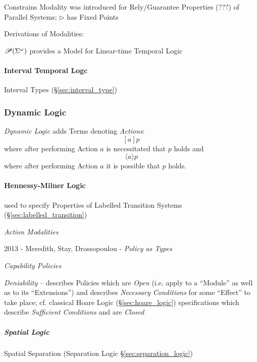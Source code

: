 Constrains Modality was introduced for Rely/Guarantee Properties (???)
of Parallel Systems; $\rhd$ has Fixed Points

Derivations of Modalities: %

$\mathscr{P}(\Sigma^\omega)$ provides a Model for Linear-time Temporal Logic
\cite{abramsky-gay-nagarajan96}



\paragraph{Interval Temporal Logc}\label{sec:interval_temporal}\hfill

Interval Types (\S\ref{sec:interval_type})



\subsubsection{Dynamic Logic}\label{sec:dynamic_logic}

\emph{Dynamic Logic} adds Terms denoting \emph{Actions}:
\[
  [a]p
\]
where after performing Action $a$ is necessitated that $p$ holds and
\[
  \langle a \rangle p
\]
where after performing Action $a$ it is possible that $p$ holds.



\paragraph{Hennessy-Milner Logic}\label{sec:hennessy_milner}
\hfill

used to specify Properties of Labelled Transition Systems
(\S\ref{sec:labelled_transition})

\emph{Action Modalities}

2013 - Meredith, Stay, Drossopoulou - \emph{Policy as Types}

\emph{Capability Policies}

\emph{Deniability} -- describes Policies which are \emph{Open} (i.e. apply to a
``Module'' as well as to its ``Extensions'') and describes \emph{Necessary
  Conditions} for some ``Effect'' to take place; cf. classical Hoare Logic
(\S\ref{sec:hoare_logic}) specifications which describe \emph{Sufficient
  Conditions} and are \emph{Closed}



\subparagraph{Spatial Logic}\label{sec:spatial_logic}
\hfill

Spatial Separation (Separation Logic \S\ref{sec:separation_logic})

